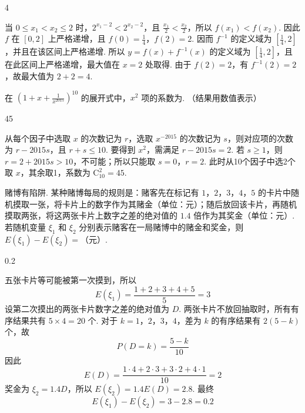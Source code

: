 \begin{answer}
4
\end{answer}

\begin{solution}
当 \(0\leqslant x_1<x_2\leqslant2\) 时，\(2^{x_1-2}<2^{x_2-2}\)，且 \(\frac{x_1}{2}<\frac{x_2}{2}\)，所以 \(f(x_1)<f(x_2)\). 因此 \(f\) 在 \([0,2]\) 上严格递增，且 \(f(0)=\frac14\)，\(f(2)=2\). 因而 \(f^{-1}\) 的定义域为 \(\left[\frac14,2\right]\)，并且在该区间上严格递增. 所以 \(y=f(x)+f^{-1}(x)\) 的定义域为 \(\left[\frac14,2\right]\)，且在此区间上严格递增，最大值在 \(x=2\) 处取得. 由于 \(f(2)=2\)，有 \(f^{-1}(2)=2\)，故最大值为 \(2+2=4\).
\end{solution}

\begin{problem}
在 \(\left(1 + x + \frac{1}{x^{2015}}\right)^{10}\) 的展开式中，\(x^2\) 项的系数为\fillinblank{}. （结果用数值表示）
\end{problem}

\begin{answer}
45
\end{answer}

\begin{solution}
从每个因子中选取 \(x\) 的次数记为 \(r\)，选取 \(x^{-2015}\) 的次数记为 \(s\)，则对应项的次数为 \(r-2015s\)，且 \(r+s\leqslant10\). 要得到 \(x^2\)，需满足 \(r-2015s=2\). 若 \(s\geqslant1\)，则 \(r=2+2015s>10\)，不可能；所以只能取 \(s=0\)，\(r=2\). 此时从10个因子中选2个取 \(x\)，其余取1，系数为 \(\mathrm C_{10}^{2}=45\).
\end{solution}

\begin{problem}
赌博有陷阱. 某种赌博每局的规则是：赌客先在标记有 \(1\)，\(2\)，\(3\)，\(4\)，\(5\) 的卡片中随机摸取一张，将卡片上的数字作为其赌金（单位：元）；随后放回该卡片，再随机摸取两张，将这两张卡片上数字之差的绝对值的 \(1.4\) 倍作为其奖金（单位：元）. 若随机变量 \(\xi_{1}\) 和 \(\xi_{2}\) 分别表示赌客在一局赌博中的赌金和奖金，则 \(E(\xi_{1}) - E(\xi_{2}) =\)\fillinblank{}（元）.
\end{problem}

\begin{answer}
0.2
\end{answer}

\begin{solution}
五张卡片等可能被第一次摸到，所以
\[
E(\xi_1)=\frac{1+2+3+4+5}{5}=3
\]
设第二次摸出的两张卡片数字之差的绝对值为 \(D\). 两张卡片不放回抽取时，所有有序结果共有 \(5\times4=20\) 个. 对于 \(k=1\)，\(2\)，\(3\)，\(4\)，差为 \(k\) 的有序结果有 \(2(5-k)\) 个，故
\[
P(D=k)=\frac{5-k}{10}
\]
因此
\[
E(D)=\frac{1\cdot4+2\cdot3+3\cdot2+4\cdot1}{10}=2
\]
奖金为 \(\xi_2=1.4D\)，所以 \(E(\xi_2)=1.4E(D)=2.8\). 最终
\[
E(\xi_1)-E(\xi_2)=3-2.8=0.2
\]
\end{solution}


